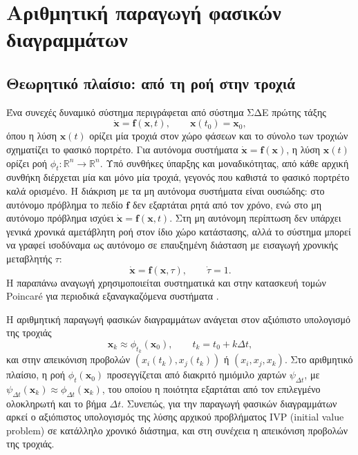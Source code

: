 \documentclass[11pt,a4paper]{report}
\begin{document}
\section{Αριθμητική παραγωγή φασικών διαγραμμάτων}

\subsection{Θεωρητικό πλαίσιο: από τη ροή στην τροχιά}
Ένα συνεχές δυναμικό σύστημα περιγράφεται από σύστημα ΣΔΕ πρώτης τάξης
\begin{equation}
\dot{\mathbf{x}} = \mathbf{f}(\mathbf{x},t), \qquad \mathbf{x}(t_0)=\mathbf{x}_0,
\end{equation}
όπου η λύση $\mathbf{x}(t)$ ορίζει μία τροχιά στον χώρο φάσεων και το σύνολο των τροχιών σχηματίζει το φασικό πορτρέτο.
Για αυτόνομα συστήματα $\dot{\mathbf{x}}=\mathbf{f}(\mathbf{x})$, η λύση
$\mathbf{x}(t)$ ορίζει ροή $\phi_t:\mathbb{R}^n\to\mathbb{R}^n$.
Υπό συνθήκες ύπαρξης και μοναδικότητας, από κάθε αρχική συνθήκη διέρχεται
μία και μόνο μία τροχιά, γεγονός που καθιστά το φασικό πορτρέτο καλά ορισμένο.
Η διάκριση με τα μη αυτόνομα συστήματα είναι ουσιώδης:
στο αυτόνομο πρόβλημα το πεδίο $\mathbf{f}$ δεν εξαρτάται ρητά από τον χρόνο,
ενώ στο μη αυτόνομο πρόβλημα ισχύει $\dot{\mathbf{x}}=\mathbf{f}(\mathbf{x},t)$.
Στη μη αυτόνομη περίπτωση δεν υπάρχει γενικά χρονικά αμετάβλητη ροή στον ίδιο χώρο
κατάστασης, αλλά το σύστημα μπορεί να γραφεί ισοδύναμα ως αυτόνομο σε επαυξημένη
διάσταση με εισαγωγή χρονικής μεταβλητής $\tau$:
\begin{equation}
\dot{\mathbf{x}}=\mathbf{f}(\mathbf{x},\tau),\qquad \dot{\tau}=1.
\end{equation}
Η παραπάνω αναγωγή χρησιμοποιείται συστηματικά και στην κατασκευή τομών Poincar\'e
για περιοδικά εξαναγκαζόμενα συστήματα \cite[Ch.~1-2]{strogatz_nonlinear,guckenheimer_holmes}.

Η αριθμητική παραγωγή φασικών διαγραμμάτων ανάγεται στον αξιόπιστο
υπολογισμό της τροχιάς
\begin{equation}
\mathbf{x}_k \approx \phi_{t_k}(\mathbf{x}_0),
\qquad t_k = t_0 + k\Delta t,
\end{equation}
και στην απεικόνιση προβολών $(x_i(t_k), x_j(t_k))$ ή $(x_i, x_j, x_k)$.
Στο αριθμητικό πλαίσιο, η ροή $\phi_t(\mathbf{x}_0)$ προσεγγίζεται από διακριτό ημιόμιλο χαρτών $\psi_{\Delta t}$, με $\psi_{\Delta t}(\mathbf{x}_k)\approx \phi_{\Delta t}(\mathbf{x}_k)$, του οποίου η ποιότητα εξαρτάται από τον επιλεγμένο ολοκληρωτή και το βήμα $\Delta t$.
Συνεπώς, για την παραγωγή φασικών διαγραμμάτων αρκεί ο αξιόπιστος υπολογισμός της λύσης αρχικού προβλήματος IVP (initial value problem) σε κατάλληλο χρονικό διάστημα, και στη συνέχεια η απεικόνιση προβολών της τροχιάς.
\end{document}

